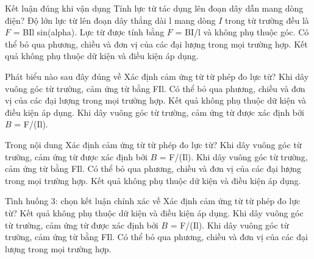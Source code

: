 \begin{ex}
Kết luận đúng khi vận dụng Tính lực từ tác dụng lên đoạn dây dẫn mang dòng điện?
\choice
{\True Độ lớn lực từ lên đoạn dây thẳng dài l mang dòng $I$ trong từ trường đều là $F$ = BIl sin(alpha).}
{Lực từ được tính bằng $F$ = BI/l và không phụ thuộc góc.}
{Có thể bỏ qua phương, chiều và đơn vị của các đại lượng trong mọi trường hợp.}
{Kết quả không phụ thuộc dữ kiện và điều kiện áp dụng.}
\end{ex}

\begin{ex}
Phát biểu nào sau đây đúng về Xác định cảm ứng từ từ phép đo lực từ?
\choice
{Khi dây vuông góc từ trường, cảm ứng từ bằng FIl.}
{Có thể bỏ qua phương, chiều và đơn vị của các đại lượng trong mọi trường hợp.}
{Kết quả không phụ thuộc dữ kiện và điều kiện áp dụng.}
{\True Khi dây vuông góc từ trường, cảm ứng từ được xác định bởi $B$ = F/(Il).}
\end{ex}

\begin{ex}
Trong nội dung Xác định cảm ứng từ từ phép đo lực từ?
\choice
{\True Khi dây vuông góc từ trường, cảm ứng từ được xác định bởi $B$ = F/(Il).}
{Khi dây vuông góc từ trường, cảm ứng từ bằng FIl.}
{Có thể bỏ qua phương, chiều và đơn vị của các đại lượng trong mọi trường hợp.}
{Kết quả không phụ thuộc dữ kiện và điều kiện áp dụng.}
\end{ex}

\begin{ex}
Tình huống 3: chọn kết luận chính xác về Xác định cảm ứng từ từ phép đo lực từ?
\choice
{Kết quả không phụ thuộc dữ kiện và điều kiện áp dụng.}
{\True Khi dây vuông góc từ trường, cảm ứng từ được xác định bởi $B$ = F/(Il).}
{Khi dây vuông góc từ trường, cảm ứng từ bằng FIl.}
{Có thể bỏ qua phương, chiều và đơn vị của các đại lượng trong mọi trường hợp.}
\end{ex}


